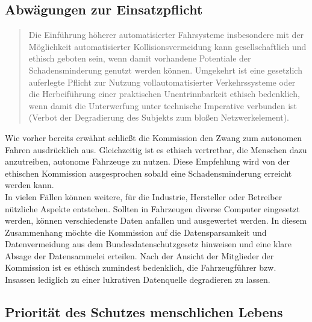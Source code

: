 \documentclass[twoside,a4paper,12pt]{article}
\begin{document}
\subsection{Abwägungen zur Einsatzpflicht} \label{AbwaegungenZurEinsatzpflicht}

\begin{quote}
\glqq
Die Einführung höherer automatisierter Fahrsysteme insbesondere mit der Möglichkeit
automatisierter Kollisionsvermeidung kann gesellschaftlich und ethisch geboten sein,
wenn damit vorhandene Potentiale der Schadensminderung genutzt werden können.
Umgekehrt ist eine gesetzlich auferlegte Pflicht zur Nutzung vollautomatisierter Verkehrssysteme oder die Herbeiführung 
einer praktischen Unentrinnbarkeit ethisch bedenklich, wenn damit die Unterwerfung unter technische Imperative verbunden 
ist (Verbot der Degradierung des Subjekts zum bloßen Netzwerkelement).\grqq\mbox{~\cite[S. 11]{ek}}
\end{quote}
Wie vorher bereits erwähnt schließt die Kommission den Zwang zum autonomen Fahren ausdrücklich aus. Gleichzeitig ist es ethisch vertretbar, die Menschen dazu anzutreiben, autonome Fahrzeuge zu nutzen. Diese Empfehlung wird von der ethischen Kommission ausgesprochen sobald eine Schadensminderung erreicht werden kann. \\
In vielen Fällen können weitere, für die Industrie, Hersteller oder Betreiber nützliche Aspekte entstehen. Sollten in Fahrzeugen diverse Computer eingesetzt werden, können verschiedenste Daten anfallen und ausgewertet werden. In diesem Zusammenhang möchte die Kommission auf die Datensparsamkeit und Datenvermeidung aus dem Bundesdatenschutzgesetz hinweisen und eine klare Absage der Datensammelei erteilen. Nach der Ansicht der Mitglieder der Kommission ist es ethisch zumindest bedenklich, die Fahrzeugführer bzw. Insassen lediglich zu einer lukrativen Datenquelle degradieren zu lassen.


\subsection{Priorität des Schutzes menschlichen Lebens} \label{PrioritäDesSchutzesMenschlichenLebens}
\end{document}
